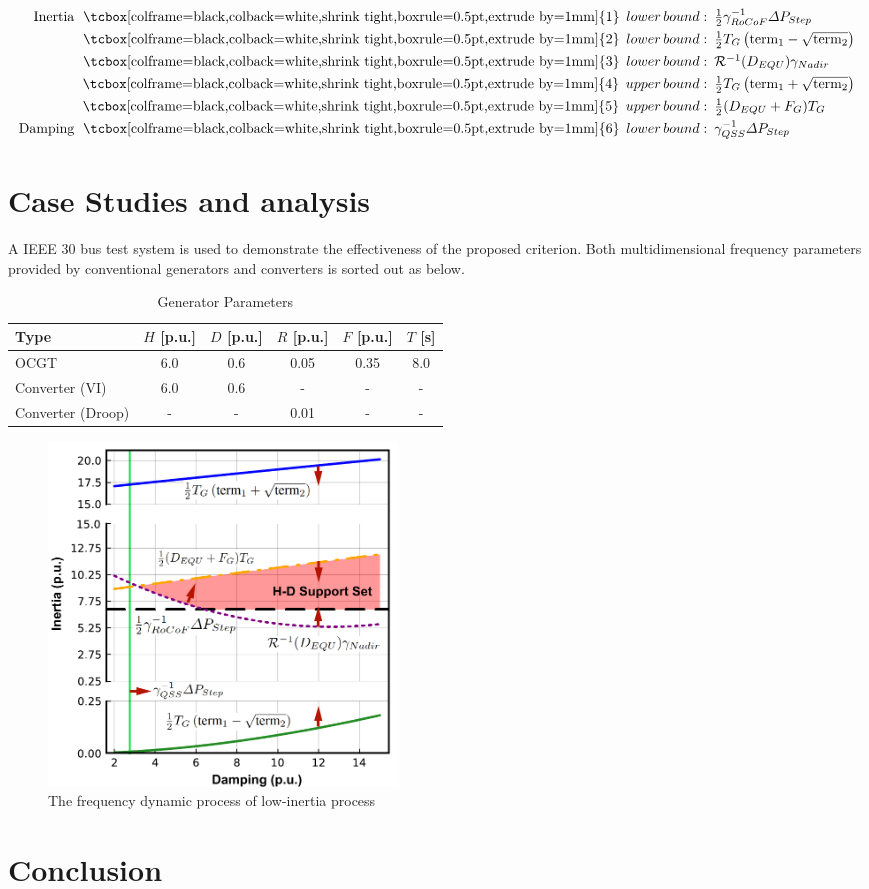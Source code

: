 \documentclass[lettersize,journal]{IEEEtran}
\newcommand{\ciao}[1]{{\setlength\fboxrule{0pt}\fbox{\tcbox[colframe=black,colback=white,shrink tight,boxrule=0.5pt,extrude by=1mm]{\small #1}}}}
\begin{document}
\begin{subequations}
  \begin{align}
    \!\!\!\begin{array}{rl}
    \text{Inertia}\,\, \ciao{1}\, lower\,bound:&\!\!\!\frac{1}{2} \gamma_{RoCoF}^{-1} \varDelta P_{Step}\\
    \ciao{2}\,lower\,bound:&\!\!\!\frac{1}{2}T_G \left(\text{term}_1 - \sqrt{\text{term}_2} \right)\\
    \ciao{3}\,lower\,bound:&\!\!\!\mathcal{R}^{-1}(D_{EQU}) \gamma_{Nadir} \\
    \ciao{4}\,upper\,bound:&\!\!\!\frac{1}{2}T_G \left(\text{term}_1 + \sqrt{\text{term}_2} \right)\\
    \ciao{5}\,upper\,bound:&\!\!\! \frac{1}{2}(D_{EQU} + F_G) T_G\\    
   \text{ Damping} \,\,\ciao{6}\,lower\,bound:&\!\!\! \gamma_{QSS}^{-1} \varDelta P_{Step}\\ 
    \end{array}
  \end{align}
\end{subequations}

\section{Case Studies and analysis}

A IEEE 30 bus test system is used to demonstrate the effectiveness of the proposed criterion. Both multidimensional frequency parameters provided by conventional generators and converters is sorted out as below. 

\begin{table}[!h]
  \centering
  \caption{Generator Parameters}
  \begin{tabular}{lccccc}
      \hline
      \textbf{Type} & $H$ [p.u.] & $D$ [p.u.] & $R$ [p.u.] & $F$ [p.u.] & $T$ [s] \\
      \hline
      OCGT & 6.0 & 0.6 & 0.05 & 0.35 & 8.0 \\
      Converter (VI) & 6.0 & 0.6 & - & - & - \\
      Converter (Droop) & - & - & 0.01 & - & - \\
      \hline
  \end{tabular}
  \label{tab:generator_parameters}
\end{table}

\begin{figure}[h]
  \centering
  \includegraphics[width=0.45\textwidth]{inertia_damping_supportset.pdf}
  \caption{The frequency dynamic process of low-inertia process}\vspace{-0.125cm}
  \label{fig:inertia_damping_supportset}
\end{figure}


\section{Conclusion}
\end{document}
